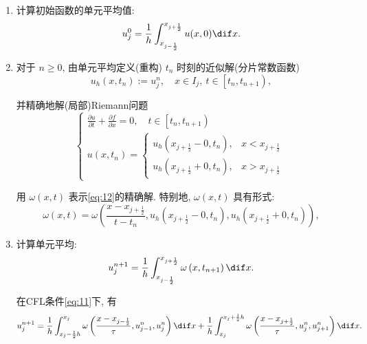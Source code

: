 \documentclass[12pt]{article}
\begin{document}
\begin{enumerate}
	\item 计算初始函数的单元平均值:
	      \begin{equation}
		      u_{j}^{0}=\frac{1}{h} \int_{x_{j-\frac{1}{2}}}^{x_{j+\frac{1}{2}}} u(x, 0) \dif x.
	      \end{equation}
	\item 对于 $n \geq 0$, 由单元平均定义(重构) $t_{n}$ 时刻的近似解(分片常数函数)
	      \begin{equation}
		      u_{h}\left(x, t_{n}\right):=u_{j}^{n}, \quad x \in I_{j},\ t \in\left[t_{n}, t_{n+1}\right),
	      \end{equation}

	      并精确地解(局部)Riemann问题
	      \begin{equation}
		      \left\{\begin{array}{l}
			      \frac{\partial u}{\partial t}+\frac{\partial f}{\partial x}=0, \quad t \in\left[t_{n}, t_{n+1}\right) \\
			      u\left(x, t_{n}\right)=\left\{\begin{array}{ll}
				      u_{h}\left(x_{j+\frac{1}{2}}-0, t_{n}\right), & x<x_{j+\frac{1}{2}} \\
				      u_{h}\left(x_{j+\frac{1}{2}}+0, t_{n}\right), & x>x_{j+\frac{1}{2}}
			      \end{array}\right.
		      \end{array}\right.
		      \label{eq:12}
	      \end{equation}


	      用 $\omega(x, t)$ 表示\cref{eq:12}的精确解. 特别地, $\omega(x, t)$ 具有形式:
	      \begin{equation}
		      \omega(x, t)=\omega\left(\frac{x-x_{j+\frac{1}{2}}}{t-t_{n}}, u_{h}\left(x_{j+\frac{1}{2}}-0, t_{n}\right), u_{h}\left(x_{j+\frac{1}{2}}+0, t_{n}\right)\right),
	      \end{equation}
	\item 计算单元平均:
	      \begin{equation}
		      u_{j}^{n+1}=\frac{1}{h} \int_{x_{j-\frac{1}{2}}}^{x_{j+\frac{1}{2}}} \omega\left(x, t_{n+1}\right) \dif x.
	      \end{equation}

	      在CFL条件\cref{eq:11}下, 有
	      \begin{equation}
		      u_{j}^{n+1}=  \frac{1}{h} \int_{x_{j}-\frac{1}{2} h}^{x_{j}} \omega\left(\frac{x-x_{j-\frac{1}{2}}}{\tau}, u_{j-1}^{n}, u_{j}^{n}\right) \dif x  +\frac{1}{h} \int_{x_{j}}^{x_{j}+\frac{1}{2} h} \omega\left(\frac{x-x_{j+\frac{1}{2}}}{\tau}, u_{j}^{n}, u_{j+1}^{n}\right) \dif x.
	      \end{equation}
\end{enumerate}
\end{document}
